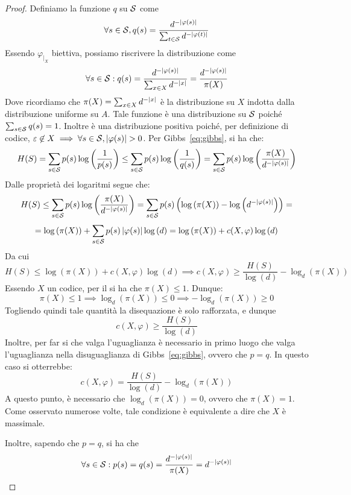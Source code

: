 \begin{proof}
  Definiamo la funzione \(q\) su \(\mathcal{S}\) come
  \[\forall s \in \mathcal{S}, q(s) = \frac{d^{-\left|\varphi(s)\right|}}{\sum_{t \in \mathcal{S}} d^{-\left|\varphi(t)\right|}}\]
  Essendo \(\varphi_{|_X}\) biettiva, possiamo riscrivere la distribuzione come
  \[\forall s \in \mathcal{S}: q(s) = \frac{d^{-\left|\varphi(s)\right|}}{\sum_{x\in X} d^{-\left|x\right|}} = \frac{d^{-\left|\varphi(s)\right|}}{\pi(X)}\]
  Dove ricordiamo che \(\pi(X) = \sum_{x\in X} d^{-\left|x\right|}\) è la distribuzione su \(X\) indotta dalla distribuzione uniforme su \(A\).
  Tale funzione è una distribuzione su \(\mathcal{S}\) poiché \(\sum_{s\in\mathcal{S}}q(s) = 1\). Inoltre è una distribuzione positiva poiché, per definizione di codice, \(\varepsilon \not\in X \implies \forall s \in \mathcal{S}, \left|\varphi(s)\right| > 0\).
  Per Gibbs~\eqref{eq:gibbs}, si ha che:
  \[H(S) = \sum_{s \in \mathcal{S}} p(s)\log\left(\frac{1}{p(s)}\right) \leq \sum_{s \in \mathcal{S}} p(s) \log\left(\frac{1}{q(s)}\right) = \sum_{s \in \mathcal{S}} p(s) \log\left(\frac{\pi(X)}{d^{-\left|\varphi(s)\right|}}\right)\]
  Dalle proprietà dei logaritmi segue che:
  \[H(S)\leq \sum_{s \in \mathcal{S}} p(s) \log\left(\frac{\pi(X)}{d^{-\left|\varphi(s)\right|}}\right)= \sum_{s \in \mathcal{S}}p(s)\left(\log\left(\pi(X)\right)-\log\left(d^{-\left|\varphi(s)\right|}\right)\right) = \]
  \[=\log\left(\pi(X)\right) + \sum_{s \in \mathcal{S}}p(s)\left|\varphi(s)\right|\log\left(d\right) = \log\left(\pi(X)\right) + c(X,\varphi)\log\left(d\right)\]
  Da cui
  \[H(S) \leq \log\left(\pi(X)\right) + c(X,\varphi)\log\left(d\right) \implies c(X,\varphi) \geq \frac{H(S)}{\log\left(d\right)} - \log_{d}(\pi(X))\]
  Essendo \(X\) un codice, per il  si ha che \(\pi(X) \leq 1\).
  Dunque:
  \[\pi(X)\leq 1 \implies \log_{d}(\pi(X)) \leq 0 \implies -\log_{d}(\pi(X)) \geq 0\]
  Togliendo quindi tale quantità la disequazione è solo rafforzata, e dunque
  \[c(X,\varphi) \geq \frac{H(S)}{\log\left(d\right)}\]
  Inoltre, per far si che valga l'uguaglianza è necessario in primo luogo che valga l'uguaglianza nella disuguaglianza di Gibbs~\eqref{eq:gibbs}, ovvero che \(p = q\).
  In questo caso si otterrebbe:
  \[c(X,\varphi) = \frac{H(S)}{\log\left(d\right)} - \log_{d}(\pi(X))\]
  A questo punto, è necessario che \(\log_{d}(\pi(X)) = 0\), ovvero che \(\pi(X) = 1\). Come osservato numerose volte, tale condizione è equivalente a dire che \(X\) è massimale.

  Inoltre, sapendo che \(p = q\), si ha che
  \[\forall s \in \mathcal{S}: p(s) = q(s) = \frac{d^{-\left|\varphi(s)\right|}}{\pi(X)} = d^{-\left|\varphi(s)\right|}\]


\end{proof}
